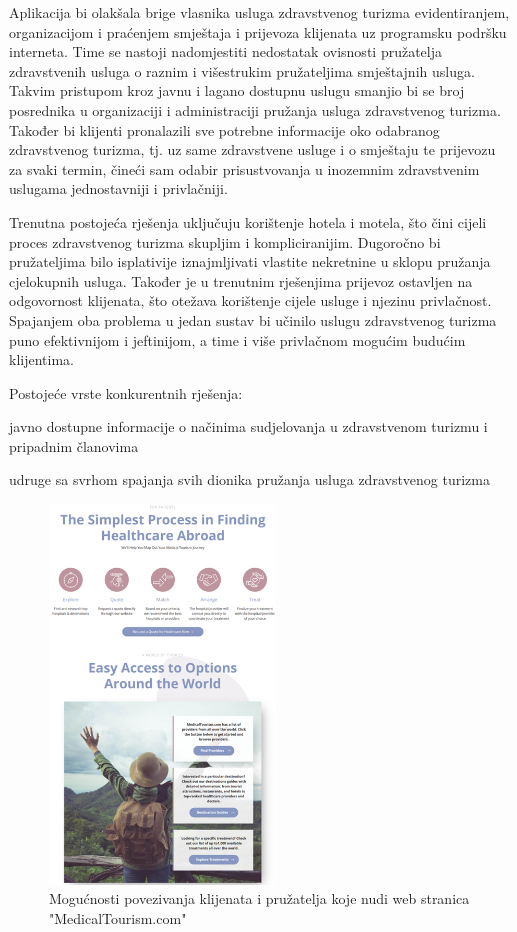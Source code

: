 		\smallskip
		Aplikacija bi olakšala brige vlasnika usluga zdravstvenog turizma evidentiranjem, organizacijom i praćenjem smještaja i prijevoza klijenata uz programsku podršku interneta. Time se nastoji nadomjestiti nedostatak ovisnosti pružatelja zdravstvenih usluga o raznim i višestrukim pružateljima smještajnih usluga. Takvim pristupom kroz javnu i lagano dostupnu uslugu smanjio bi se broj posrednika u organizaciji i administraciji pružanja usluga zdravstvenog turizma. Također bi klijenti pronalazili sve potrebne informacije oko odabranog zdravstvenog turizma, tj. uz same zdravstvene usluge i o smještaju te prijevozu za svaki termin, čineći sam odabir prisustvovanja u inozemnim zdravstvenim uslugama jednostavniji i privlačniji.
		
		\smallskip
		Trenutna postojeća rješenja uključuju korištenje hotela i motela, što čini cijeli proces zdravstvenog turizma skupljim i kompliciranijim. Dugoročno bi pružateljima bilo isplativije iznajmljivati vlastite nekretnine u sklopu pružanja cjelokupnih usluga. Također je u trenutnim rješenjima prijevoz ostavljen na odgovornost klijenata, što otežava korištenje cijele usluge i njezinu privlačnost. Spajanjem oba problema u jedan sustav bi učinilo uslugu zdravstvenog turizma puno efektivnijom i jeftinijom, a time i više privlačnom mogućim budućim klijentima.
		
		\smallskip
		\noindent Postojeće vrste konkurentnih rješenja:
		\begin{packed_item}
			\item  javno dostupne informacije o načinima sudjelovanja u zdravstvenom turizmu i pripadnim članovima
			\item  udruge sa svrhom spajanja svih dionika pružanja usluga zdravstvenog turizma
		\end{packed_item}
		
		\break
		\begin{figure}
			\includegraphics[width=6cm]{slike/konkurencija.png} %
			\caption{Mogućnosti povezivanja klijenata i pružatelja koje nudi web stranica "MedicalTourism.com"}
			\label{fig:konkurencija}
			\centering
		\end{figure}
		
